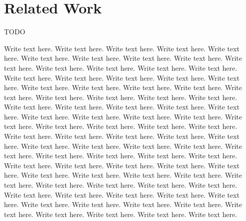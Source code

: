 \documentclass{llncs}
\begin{document}
\section{Related Work}
TODO

\citet{AhnShe11}

Write text here.  Write text here.  Write text here.  Write text here.
Write text here.  Write text here.  Write text here.  Write text here.
Write text here.  Write text here.  Write text here.  Write text here.
Write text here.  Write text here.  Write text here.  Write text here.
Write text here.  Write text here.  Write text here.  Write text here.
Write text here.  Write text here.  Write text here.  Write text here.
Write text here.  Write text here.  Write text here.  Write text here.
Write text here.  Write text here.  Write text here.  Write text here.
Write text here.  Write text here.  Write text here.  Write text here.
Write text here.  Write text here.  Write text here.  Write text here.
Write text here.  Write text here.  Write text here.  Write text here.
Write text here.  Write text here.  Write text here.  Write text here.
Write text here.  Write text here.  Write text here.  Write text here.
Write text here.  Write text here.  Write text here.  Write text here.
Write text here.  Write text here.  Write text here.  Write text here.
Write text here.  Write text here.  Write text here.  Write text here.
Write text here.  Write text here.  Write text here.  Write text here.
Write text here.  Write text here.  Write text here.  Write text here.
Write text here.  Write text here.  Write text here.  Write text here.
Write text here.  Write text here.  Write text here.  Write text here.
Write text here.  Write text here.  Write text here.  Write text here.





\end{document}
